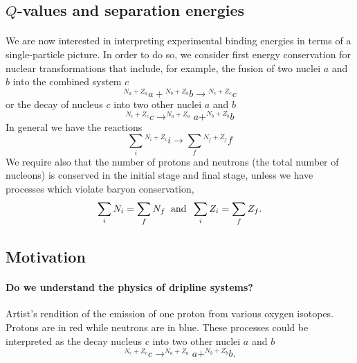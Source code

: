\documentclass[%
twoside,                 %
final,                   %
10pt]{article}
\begin{document}
\subsection*{$Q$-values and separation energies}

\paragraph{}
We are now interested in interpreting experimental binding energies  in terms of a single-particle picture.
In order to do so, we  consider first energy conservation for nuclear transformations that include, for
example, the fusion of two nuclei $a$ and $b$ into the combined system $c$
\[
{^{N_a+Z_a}}a+ {^{N_b+Z_b}}b\rightarrow {^{N_c+Z_c}}c
\]
or the decay of nucleus $c$ into two other nuclei $a$ and $b$
\[
^{N_c+Z_c}c \rightarrow  ^{N_a+Z_a}a+ ^{N_b+Z_b}b
\]
In general we have the reactions
\[
\sum_i {^{N_i+Z_i}}i \rightarrow  \sum_f {^{N_f+Z_f}}f
\]
We require also that the number of protons and neutrons (the total number of nucleons) is conserved in the initial stage and final stage, unless we have processes which violate baryon conservation, 
\[
\sum_iN_i = \sum_f N_f \hspace{0.2cm}\mathrm{and} \hspace{0.2cm}\sum_iZ_i = \sum_f Z_f.
\]



\subsection*{Motivation}

\paragraph{Do we understand the physics of dripline systems?}
Artist's rendition of the emission of one proton from various oxygen isotopes. Protons are in red while neutrons are in blue. These processes could be interpreted as the decay
nucleus $c$ into two other nuclei $a$ and $b$
\[
^{N_c+Z_c}c \rightarrow  ^{N_a+Z_a}a+ ^{N_b+Z_b}b .
\]
\end{document}
